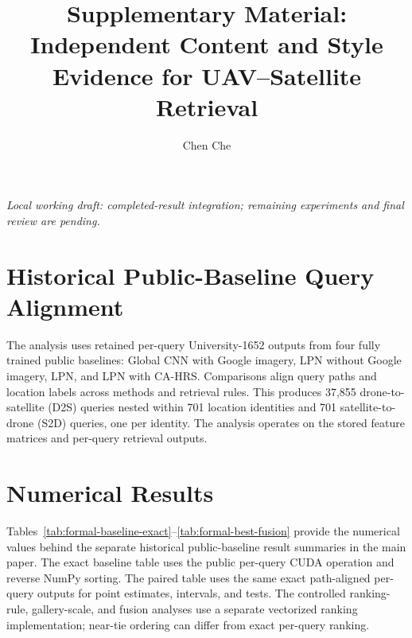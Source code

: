 \documentclass[journal]{IEEEtran}
\title{Supplementary Material: Independent Content and Style Evidence for UAV--Satellite Retrieval}
\author{Chen Che}
\begin{document}
\maketitle
{}
\begin{center}\footnotesize\itshape
Local working draft: completed-result integration; remaining experiments and final review are pending.
\end{center}



\section{Historical Public-Baseline Query Alignment}

The analysis uses retained per-query University-1652 outputs from four fully
trained public baselines: Global CNN with Google imagery, LPN without Google
imagery, LPN, and LPN with CA-HRS.  Comparisons align query paths and location labels across methods and
retrieval rules.  This produces 37,855 drone-to-satellite (D2S) queries nested within
701 location identities and 701 satellite-to-drone (S2D) queries, one per
identity.  The analysis operates on the stored feature matrices and per-query
retrieval outputs.

\section{Numerical Results}

Tables~\ref{tab:formal-baseline-exact}--\ref{tab:formal-best-fusion} provide
the numerical values behind the separate historical public-baseline
result summaries in the main paper.
The exact baseline table uses the public per-query CUDA operation and reverse
NumPy sorting.  The paired table uses the same exact path-aligned per-query outputs for
point estimates, intervals, and tests. The controlled ranking-rule,
gallery-scale, and fusion analyses use a separate vectorized ranking
implementation; near-tie ordering can differ from exact per-query ranking.






\end{document}
